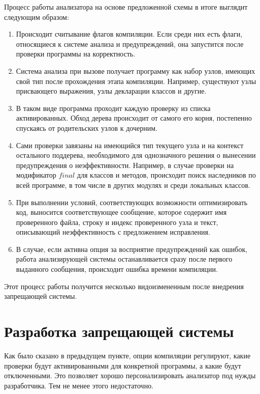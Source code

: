 \documentclass{mipt-thesis-bs}
\begin{document}
Процесс работы анализатора на основе предложенной схемы в итоге выглядит следующим образом:

\begin{enumerate}
    \item Происходит считывание флагов компиляции. Если среди них есть флаги, относящиеся к 
    системе анализа и предупреждений, она запустится после проверки программы на корректность.
    \item Система анализа при вызове получает программу как набор узлов, имеющих свой тип после 
    прохождения этапа компиляции. Например, существуют узлы присвающего выражения, узлы 
    декларации классов и другие.
    \item В таком виде программа проходит каждую проверку из списка активированных. Обход 
    дерева происходит от самого его корня, постепенно спускаясь от родительских узлов к дочерним.
    \item Сами проверки завязаны на имеющийся тип текущего узла и на контекст остального 
    поддерева, необходимого для однозначного решения о вынесении предупреждения о неэффективности.
    Например, в случае проверки на модификатор $final$ для классов и методов, происходит поиск 
    наследников по всей программе, в том числе в других модулях и среди локальных классов.
    \item При выполнении условий, соответствующих возможности оптимизировать код, выносится 
    соответствующее сообщение, которое содержит имя проверенного файла, строку и индекс 
    проверенного узла и текст, описывающий неэффективность с предложением исправления.
    \item В случае, если активна опция за восприятие предупреждений как ошибок, работа 
    анализирующей системы останавливается сразу после первого выданного сообщения, происходит 
    ошибка времени компиляции.
\end{enumerate}

Этот процесс работы получится несколько видоизмененным после внедрения запрещающей системы.

\section{Разработка запрещающей системы}

Как было сказано в предыдущем пункте, опции компиляции регулируют, какие проверки будут 
активированными для конкретной программы, а какие будут отключенными. Это позволяет хорошо 
персонализировать анализатор под нужды разработчика. Тем не менее этого недостаточно.
\end{document}

